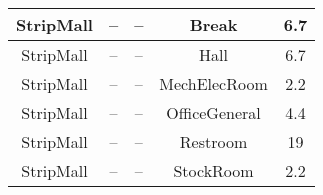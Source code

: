 \begin{table}
\begin{tabular}{|c|c|c|c|c|}
StripMall              & --                      & --                                                                                                            & Break                        & 6.7                                                                                                            \\ \hline
StripMall              & --                      & --                                                                                                            & Hall                         & 6.7                                                                                                            \\ \hline
StripMall              & --                      & --                                                                                                            & MechElecRoom                 & 2.2                                                                                                            \\ \hline
StripMall              & --                      & --                                                                                                            & OfficeGeneral                & 4.4                                                                                                            \\ \hline
StripMall              & --                      & --                                                                                                            & Restroom                     & 19                                                                                                             \\ \hline
StripMall              & --                      & --                                                                                                            & StockRoom                    & 2.2                                                                                                            \\ \hline
\end{tabular}
\end{table}